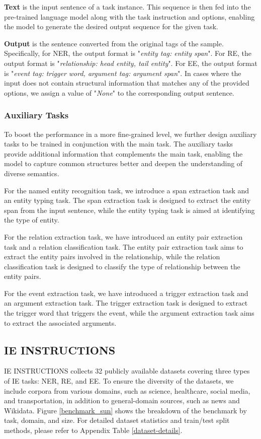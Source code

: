 \documentclass[11pt]{article}
\begin{document}
\textbf{Text} is the input sentence of a task instance. This sequence is then fed into the pre-trained language model along with the task instruction and options, enabling the model to generate the desired output sequence for the given task.

\textbf{Output} is the sentence converted from the original tags of the sample. Specifically, for NER, the output format is "\textit{entity tag: entity span}". For RE, the output format is "\textit{relationship: head entity, tail entity}". For EE, the output format is "\textit{event tag: trigger word, argument tag: argument span}". In cases where the input does not contain structural information that matches any of the provided options, we assign a value of "\textit{None}" to the corresponding output sentence.


\subsubsection{Auxiliary Tasks}
To boost the performance in a more fine-grained level, we further design auxiliary tasks to be trained in conjunction with the main task. The auxiliary tasks provide additional information that complements the main task, enabling the model to capture common structures better and deepen the understanding of diverse semantics.

For the named entity recognition task, we introduce a span extraction task and an entity typing task. The span extraction task is designed to extract the entity span from the input sentence, while the entity typing task is aimed at identifying the type of entity.

For the relation extraction task, we have introduced an entity pair extraction task and a relation classification task. The entity pair extraction task aims to extract the entity pairs involved in the relationship, while the relation classification task is designed to classify the type of relationship between the entity pairs.

For the event extraction task, we have introduced a trigger extraction task and an argument extraction task. The trigger extraction task is designed to extract the trigger word that triggers the event, while the argument extraction task aims to extract the associated arguments.


\subsection{IE INSTRUCTIONS}
IE INSTRUCTIONS collects 32 publicly available datasets covering three types of IE tasks: NER, RE, and EE. To ensure the diversity of the datasets, we include corpora from various domains, such as science, healthcare, social media, and transportation, in addition to general-domain sources, such as news and Wikidata. Figure \ref{benchmark_sun} shows the breakdown of the benchmark by task, domain, and size. For detailed dataset statistics and train/test split methods, please refer to Appendix Table \ref{dataset-details}.
\end{document}
